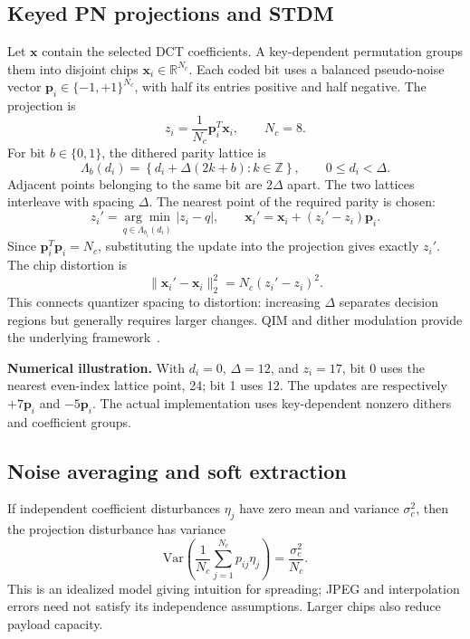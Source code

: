 \documentclass[11pt,a4paper]{article}
\newcommand{\R}{\mathbb{R}}
\newcommand{\vect}[1]{\bm{#1}}
\begin{document}
\subsection{Keyed PN projections and STDM}
Let $\vect{x}$ contain the selected DCT coefficients. A key-dependent permutation
groups them into disjoint chips $\vect{x}_i\in\R^{N_c}$. Each coded bit uses a balanced
pseudo-noise vector $\vect{p}_i\in\{-1,+1\}^{N_c}$, with half its entries positive and
half negative. The projection is
\begin{equation}
z_i=\frac{1}{N_c}\vect{p}_i^T\vect{x}_i,\qquad N_c=8.
\end{equation}
For bit $b\in\{0,1\}$, the dithered parity lattice is
\begin{equation}
\Lambda_b(d_i)=\left\{d_i+\Delta(2k+b):k\in\mathbb{Z}\right\},
\qquad 0\le d_i<\Delta.
\end{equation}
Adjacent points belonging to the same bit are $2\Delta$ apart. The two lattices
interleave with spacing $\Delta$. The nearest point of the required parity is chosen:
\begin{equation}
z_i'=\underset{q\in\Lambda_{b_i}(d_i)}{\arg\min}\,|z_i-q|,
\qquad
\vect{x}_i'=\vect{x}_i+(z_i'-z_i)\vect{p}_i.
\label{eq:embed}
\end{equation}
Since $\vect{p}_i^T\vect{p}_i=N_c$, substituting the update into the projection gives
exactly $z_i'$. The chip distortion is
\begin{equation}
\|\vect{x}_i'-\vect{x}_i\|_2^2=N_c(z_i'-z_i)^2.
\end{equation}
This connects quantizer spacing to distortion: increasing $\Delta$ separates
decision regions but generally requires larger changes. QIM and dither modulation
provide the underlying framework~\cite{chen}.

\textbf{Numerical illustration.} With $d_i=0$, $\Delta=12$, and $z_i=17$, bit 0
uses the nearest even-index lattice point, 24; bit 1 uses 12. The updates are
respectively $+7\vect{p}_i$ and $-5\vect{p}_i$. The actual implementation uses
key-dependent nonzero dithers and coefficient groups.

\subsection{Noise averaging and soft extraction}
If independent coefficient disturbances $\eta_j$ have zero mean and variance
$\sigma_c^2$, then the projection disturbance has variance
\begin{equation}
\mathrm{Var}\!\left(\frac{1}{N_c}\sum_{j=1}^{N_c}p_{ij}\eta_j\right)
=\frac{\sigma_c^2}{N_c}.
\end{equation}
This is an idealized model giving intuition for spreading; JPEG and interpolation
errors need not satisfy its independence assumptions. Larger chips also reduce
payload capacity.
\end{document}
